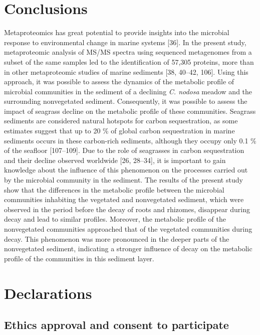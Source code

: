\documentclass[
  12 pt,
]{article}
\begin{document}
\newpage

\hypertarget{conclusions}{%
\section{Conclusions}\label{conclusions}}

Metaproteomics has great potential to provide insights into the microbial response to environmental change in marine systems {[}36{]}. In the present study, metaproteomic analysis of MS/MS spectra using sequenced metagenomes from a subset of the same samples led to the identification of 57,305 proteins, more than in other metaproteomic studies of marine sediments {[}38, 40--42, 106{]}. Using this approach, it was possible to assess the dynamics of the metabolic profile of microbial communities in the sediment of a declining \emph{C. nodosa} meadow and the surrounding nonvegetated sediment. Consequently, it was possible to assess the impact of seagrass decline on the metabolic profile of these communities. Seagrass sediments are considered natural hotspots for carbon sequestration, as some estimates suggest that up to 20 \si{\percent} of global carbon sequestration in marine sediments occurs in these carbon-rich sediments, although they occupy only 0.1 \si{\percent} of the seafloor {[}107--109{]}. Due to the role of seagrasses in carbon sequestration and their decline observed worldwide {[}26, 28--34{]}, it is important to gain knowledge about the influence of this phenomenon on the processes carried out by the microbial community in the sediment. The results of the present study show that the differences in the metabolic profile between the microbial communities inhabiting the vegetated and nonvegetated sediment, which were observed in the period before the decay of roots and rhizomes, disappear during decay and lead to similar profiles. Moreover, the metabolic profile of the nonvegetated communities approached that of the vegetated communities during decay. This phenomenon was more pronounced in the deeper parts of the nonvegetated sediment, indicating a stronger influence of decay on the metabolic profile of the communities in this sediment layer.

\newpage

\hypertarget{declarations}{%
\section{Declarations}\label{declarations}}

\hypertarget{ethics-approval-and-consent-to-participate}{%
\subsection{Ethics approval and consent to participate}\label{ethics-approval-and-consent-to-participate}}
\end{document}
